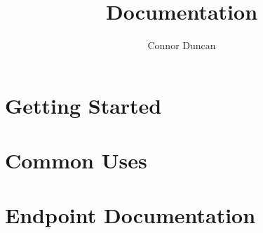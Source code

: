 \documentclass{article}
\author{Connor Duncan}
\title{\td Documentation}
\begin{document}
\maketitle
\section{Getting Started}

\section{Common Uses}

\section{Endpoint Documentation}
\end{document}
